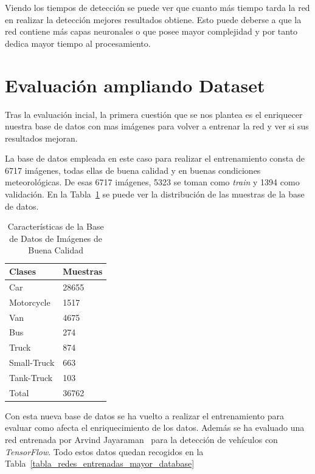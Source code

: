 Viendo los tiempos de detección se puede ver que cuanto más tiempo tarda la red en realizar la detección mejores resultados obtiene. Esto puede deberse a que la red contiene más capas neuronales o que posee mayor complejidad y por tanto dedica mayor tiempo al procesamiento.


\section{Evaluación ampliando Dataset}\label{sec.ampliado_dataset}

Tras la evaluación incial, la primera cuestión que se nos plantea es el enriquecer nuestra base de datos con mas imágenes para volver a entrenar la red y ver si sus resultados mejoran. 

La base de datos empleada en este caso para realizar el entrenamiento consta de 6717 imágenes, todas ellas de buena calidad y en buenas condiciones meteorológicas. De esas 6717 imágenes, 5323 se toman como \textit{train} y 1394 como validación. En la Tabla~\ref{tabla_redes_database_mayor} se puede ver la distribución de las muestras de la base de datos.

\begin{table}[H]
\begin{center}
\begin{tabular}{|l|l|}
\hline
Clases & Muestras \\
\hline \hline
Car & 28655 \\ \hline
Motorcycle & 1517 \\ \hline
Van & 4675 \\ \hline
Bus & 274 \\ \hline
Truck & 874 \\ \hline
Small-Truck & 663 \\ \hline
Tank-Truck & 103 \\ \hline
Total & 36762 \\ \hline
\end{tabular}
\caption{Características de la Base de Datos de Imágenes de Buena Calidad}
\label{tabla_redes_database_mayor}
\end{center}
\end{table}

Con esta nueva base de datos se ha vuelto a realizar el entrenamiento para evaluar como afecta el enriquecimiento de los datos. Además se ha evaluado una red entrenada por Arvind Jayaraman~\cite{CarND_VehicleDetection} para la detección de vehículos con \textit{TensorFlow}. Todo estos datos quedan recogidos en la Tabla~\ref{tabla_redes_entrenadas_mayor_database}

